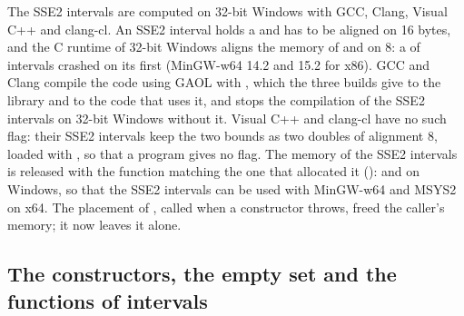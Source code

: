 \medskip
The SSE2 intervals are computed on 32-bit Windows with GCC, Clang, Visual C++
and clang-cl.\newinvfive{} An SSE2 interval holds a  and has
to be aligned on 16 bytes, and the C runtime of 32-bit Windows aligns the
memory of  and  on 8: a  of
intervals crashed on its first  (MinGW-w64 14.2 and 15.2 for
x86). GCC and Clang compile the code using GAOL with
, which the three builds give to the library and to
the code that uses it, and  stops the compilation of
the SSE2 intervals on 32-bit Windows without it. Visual C++ and clang-cl have
no such flag: their SSE2 intervals keep the two bounds as two doubles of
alignment 8, loaded with , so that a program gives no flag. The
memory of the SSE2 intervals is released with the function matching the one
that allocated it ():  and
 on Windows, so that the SSE2 intervals can be used
with MinGW-w64 and MSYS2 on x64. The placement  of
, called when a constructor throws, freed the caller's memory;
it now leaves it alone.

\subsection[The constructors, the empty set and the interval functions]{The constructors, the empty set and the functions of intervals}
\label{sec:changes-intervals}
%
%


